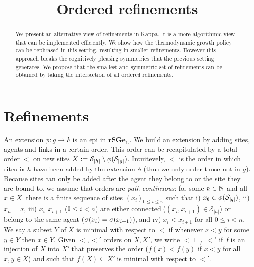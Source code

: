 \documentclass[a4paper,12pt]{article}
\title{Ordered refinements}
\newcommand{\anon}[1]{\left|#1\right|}
\newcommand{\gp}{\Gamma}
\newcommand{\rSGe}{\mathbf{rSGe}}
\newcommand{\edges}{\mathcal{E}}
\begin{document}
\maketitle

\begin{abstract}
  We present an alternative view of refinements in Kappa.
  It is a more algorithmic view that can be implemented efficiently.
  We show how the thermodynamic growth policy
  can be rephrased in this setting,
  resulting in smaller refinements.
  However this approach breaks the cognitively pleasing symmetries
  that the previous setting generates.
  We propose that the smallest and symmetric set of refinements
  can be obtained by taking the intersection of all ordered refinements.
\end{abstract}

\section{Refinements}

An extension $\phi: g \to h$ is an epi in $\rSGe_C$.
We build an extension by adding sites, agents and links
in a certain order.
This order can be recapitulated by a total order $<$ on new sites
$X := \sites_{\anon{h}} \setminus \phi(\sites_{\anon{g}})$.
Intuitevely, $<$ is the order in which sites in $h$
have been added by the extension $\phi$
(thus we only order those not in $g$).
Because sites can only be added after
the agent they belong to
or the site they are bound to,
we assume that orders are \emph{path-continuous}:
for some $n \in \mathbb{N}$ and all $x \in X$,
there is a finite sequence of sites $(x_i)_{0 \leq i \leq n}$
such that i) $x_0 \in \phi(\sites_{\anon{g}})$,
ii) $x_n = x$,
iii) $x_i,x_{i+1}$ ($0 \leq i < n$)
are either connected ($(x_i,x_{i+1}) \in \edges_{\anon{h}}$)
or belong to the same agent ($\sigma(x_i) = \sigma(x_{i+1})$),
and iv) $x_i < x_{i+1}$ for all $0 \leq i < n$.
We say a subset $Y$ of $X$ is minimal with respect to $<$
if whenever $x < y$ for some $y \in Y$ then $x \in Y$. %
Given $<,<'$ orders on $X,X'$,
we write $< \,\sqsubseteq_f\, <'$ if
$f$ is an injection of $X$ into $X'$
that preserves the order
($f(x) < f(y)$ if $x < y$ for all $x,y \in X$)
and such that $f(X) \subseteq X'$ is minimal with respect to $<'$.
\end{document}
